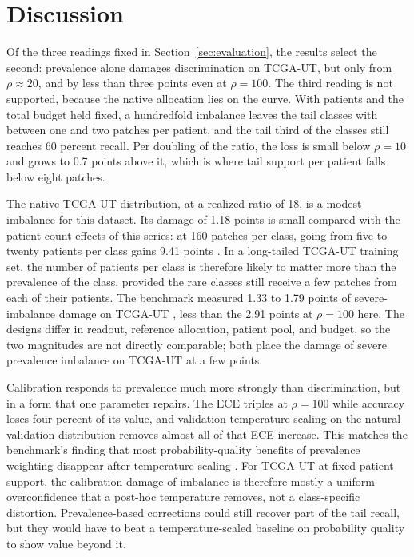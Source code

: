 \section{Discussion}
\label{sec:discussion}
Of the three readings fixed in Section~\ref{sec:evaluation}, the results select the second: prevalence alone damages discrimination on TCGA-UT, but only from $\rho\approx20$, and by less than three points even at $\rho=100$. The third reading is not supported, because the native allocation lies on the curve. With patients and the total budget held fixed, a hundredfold imbalance leaves the tail classes with between one and two patches per patient, and the tail third of the classes still reaches 60 percent recall. Per doubling of the ratio, the loss is small below $\rho=10$ and grows to 0.7 points above it, which is where tail support per patient falls below eight patches.

The native TCGA-UT distribution, at a realized ratio of 18, is a modest imbalance for this dataset. Its damage of 1.18 points is small compared with the patient-count effects of this series: at 160 patches per class, going from five to twenty patients per class gains 9.41 points \citep{queisler2026centreError}. In a long-tailed TCGA-UT training set, the number of patients per class is therefore likely to matter more than the prevalence of the class, provided the rare classes still receive a few patches from each of their patients. The benchmark measured 1.33 to 1.79 points of severe-imbalance damage on TCGA-UT \citep{queisler2026benchmarkResults}, less than the 2.91 points at $\rho=100$ here. The designs differ in readout, reference allocation, patient pool, and budget, so the two magnitudes are not directly comparable; both place the damage of severe prevalence imbalance on TCGA-UT at a few points.

Calibration responds to prevalence much more strongly than discrimination, but in a form that one parameter repairs. The ECE triples at $\rho=100$ while accuracy loses four percent of its value, and validation temperature scaling on the natural validation distribution removes almost all of that ECE increase. This matches the benchmark's finding that most probability-quality benefits of prevalence weighting disappear after temperature scaling \citep{queisler2026benchmarkResults}. For TCGA-UT at fixed patient support, the calibration damage of imbalance is therefore mostly a uniform overconfidence that a post-hoc temperature removes, not a class-specific distortion. Prevalence-based corrections \citep{buda2018systematic} could still recover part of the tail recall, but they would have to beat a temperature-scaled baseline on probability quality to show value beyond it.

